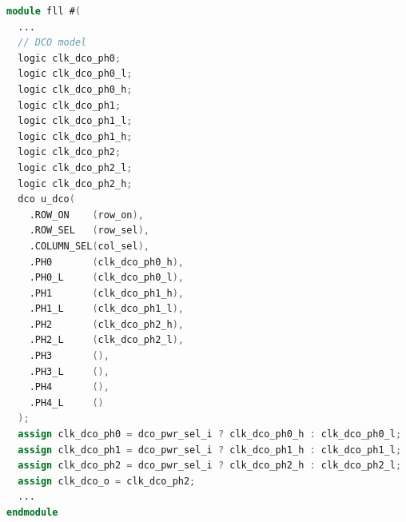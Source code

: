 \documentclass[master]{finthesis}
\begin{document}
\begin{lstlisting}[language=Verilog, caption={Инстанцирање дигитално контролисаног осцилатора.}, label={lst:sv:dco_inst}]
module fll #(
  ...
  // DCO model
  logic clk_dco_ph0;
  logic clk_dco_ph0_l;
  logic clk_dco_ph0_h;
  logic clk_dco_ph1;
  logic clk_dco_ph1_l;
  logic clk_dco_ph1_h;
  logic clk_dco_ph2;
  logic clk_dco_ph2_l;
  logic clk_dco_ph2_h;
  dco u_dco(
    .ROW_ON    (row_on),
    .ROW_SEL   (row_sel),
    .COLUMN_SEL(col_sel),
    .PH0       (clk_dco_ph0_h),
    .PH0_L     (clk_dco_ph0_l),
    .PH1       (clk_dco_ph1_h),
    .PH1_L     (clk_dco_ph1_l),
    .PH2       (clk_dco_ph2_h),
    .PH2_L     (clk_dco_ph2_l),
    .PH3       (),
    .PH3_L     (),
    .PH4       (),
    .PH4_L     ()
  );
  assign clk_dco_ph0 = dco_pwr_sel_i ? clk_dco_ph0_h : clk_dco_ph0_l;
  assign clk_dco_ph1 = dco_pwr_sel_i ? clk_dco_ph1_h : clk_dco_ph1_l;
  assign clk_dco_ph2 = dco_pwr_sel_i ? clk_dco_ph2_h : clk_dco_ph2_l;
  assign clk_dco_o = clk_dco_ph2;
  ...
endmodule
\end{lstlisting}
\end{document}
